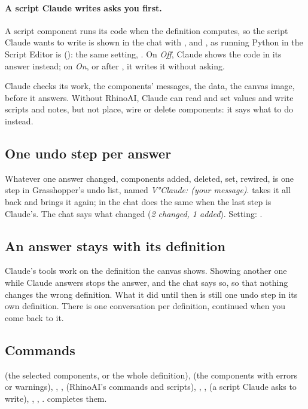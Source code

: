 \paragraph{A script Claude writes asks you first.} A script component runs its code when the definition computes, so
the script Claude wants to write is shown in the chat with ,  and , as running Python in the
Script Editor is (): the same setting, . On \emph{Off}, Claude shows the
code in its answer instead; on \emph{On}, or after , it writes it without asking.

Claude checks its work, the components' messages, the data, the canvas image, before it answers. Without RhinoAI,
Claude can read and set values and write scripts and notes, but not place, wire or delete components: it says what to
do instead.

\subsection{One undo step per answer}

Whatever one answer changed, components added, deleted, set, rewired, is one step in Grasshopper's undo list, named
\emph{V°Claude: (your message)}.  takes it all back and  brings it again;  in the chat does
the same when the last step is Claude's. The chat says what changed (\emph{2 changed, 1 added}).
Setting: .

\subsection{An answer stays with its definition}

Claude's tools work on the definition the canvas shows. Showing another one while Claude answers stops the answer, and
the chat says so, so that nothing changes the wrong definition. What it did until then is still one undo step in its own
definition. There is one conversation per definition, continued when you come back to it.

\subsection{Commands}

 (the selected components, or the whole definition),  (the components with errors or warnings),
, ,  (RhinoAI's commands and scripts), , , 
(a script Claude asks to write), , , .
 completes them.

